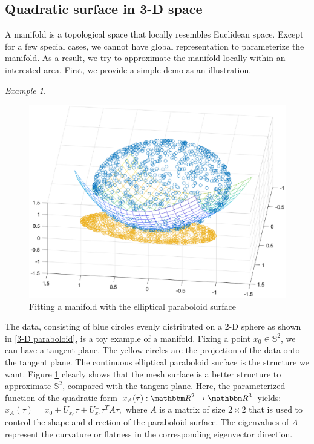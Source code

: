 \documentclass{article}
\theoremstyle{remark}
\newtheorem{example}{Example}
\begin{document}
\subsection{Quadratic surface in 3-D space}
A manifold is a topological space that locally resembles Euclidean space. Except for a few special cases, we cannot have global representation to parameterize the manifold. As a result, we try to approximate the manifold locally within an interested area. First, we provide a simple demo as an illustration.
\begin{example}
\begin{figure}[H] %
   \centering
   \includegraphics[width=0.7\linewidth]{demo.eps} 
   \vspace{-0.4cm}
   \caption{Fitting a manifold with the elliptical paraboloid surface}
   \label{3-D paraboloid}
\end{figure}
The data, consisting of blue circles evenly distributed on a 2-D sphere as shown in \eqref{3-D paraboloid}, is a toy example of a manifold. Fixing a point $x_0\in {\mathbb S}^2$, we can have a tangent plane. The yellow circles are the projection of the data onto the tangent plane. The continuous elliptical paraboloid surface is the structure we want.
Figure \ref{3-D paraboloid} clearly shows that the mesh surface is a better structure to approximate $\mathbb{S}^2$, compared with the tangent plane. Here, the parameterized function of the quadratic form  $x_A(\tau): {\mathbbm R}^2\rightarrow {\mathbbm R}^3$ yields:
$
x_A(\tau) = x_0 + U_{x_0} \tau + {U_{x_0}^\perp} \tau^T A \tau,
$
where $A$ is a matrix of size $2\times 2$ that is used to control the shape and direction of the paraboloid surface. The eigenvalues of $A$ represent the curvature or flatness in the corresponding eigenvector direction.
\end{example}
\end{document}
